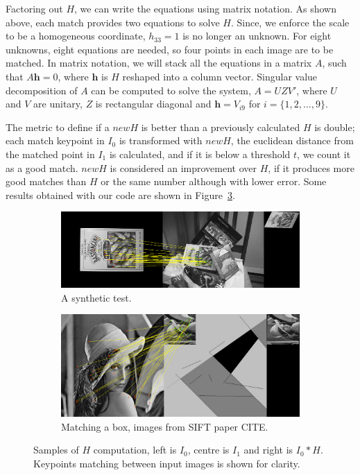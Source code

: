 \documentclass[12pt]{article}
\begin{document}
Factoring out $H$, we can write the equations using matrix notation. 
As shown above, each match provides two equations to solve $H$.
Since, we enforce the scale to be a homogeneous coordinate, $h_{33} = 1$ is no longer an unknown.
For eight unknowns, eight equations are needed, so four points in each image are to be matched.
In matrix notation, we will stack all the equations in a matrix $A$, such that $A\mathbf{h}=0$, where $\mathbf{h}$ is $H$ reshaped into a column vector.
Singular value decomposition of $A$ can be computed to solve the system, $A = UZV'$, where $U$ and $V$ are unitary, $Z$ is rectangular diagonal and $\mathbf{h} = V_{i9}$ for $i = \lbrace 1,2, \ldots, 9 \rbrace$.

The metric to define if a $newH$ is better than a previously calculated $H$ is double; each match keypoint in $I_0$ is transformed with $newH$, the euclidean distance from the matched point in $I_1$ is calculated, and if it is below a threshold $t$, we count it as a good match.
$newH$ is considered an improvement over $H$, if it produces more good matches than $H$ or the same number although with lower error.
Some results obtained with our code are shown in Figure~\ref{fig:ransacSample}.

\begin{figure}[htbp!]
        \centering
        \begin{subfigure}[b]{0.7\textwidth}
                \includegraphics[width=\textwidth]{images/ransac1}
                \caption{A synthetic test.}
                \label{fig:ransac1}
        \end{subfigure}    
        \begin{subfigure}[b]{0.7\textwidth}
                \includegraphics[width=\textwidth]{images/ransac2}
                \caption{Matching a box, images from SIFT paper CITE.}
                \label{fig:ransac2}
        \end{subfigure} 
        \caption{Samples of $H$ computation, left is $I_0$, centre is $I_1$ and right is $I_0 * H$. Keypoints matching between input images is shown for clarity.}\label{fig:ransacSample}
\end{figure}
\end{document}
